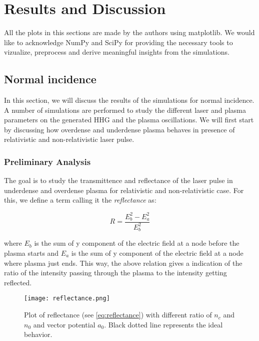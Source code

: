 \section{Results and Discussion}

All the plots in this sections are made by the authors using matplotlib\cite{matplotlib}. We would like to acknowledge NumPy\cite{numpy} and SciPy\cite{scipy} for providing the necessary tools to vizualize, preprocess and derive meaningful insights from the simulations.

\subsection{Normal incidence}
In this section, we will discuss the results of the simulations for normal incidence. A number of simulations are performed to study the different laser and plasma parameters on the generated HHG and the plasma oscillations. We will first start by discussing how overdense and underdense plasma behaves in presence of relativistic and non-relativistic laser pulse.

\subsubsection{Preliminary Analysis}

The goal is to study the transmittence and reflectance of the laser pulse in underdense and overdense plasma for relativistic and non-relativistic case. For this, we define a term calling it the \textit{reflectance} as:

\begin{equation}
    \label{eq:reflectance}
    R = \frac{{E_{b}^2}-{E_{a}^2}}{{E_{b}^2}}
\end{equation}

where $E_{b}$ is the sum of y component of the electric field at a node before the plasma starts and $E_{a}$ is the sum of y component of the electric field at a node where plasma just ends. This way, the above relation gives a indication of the ratio of the intensity passing through the plasma to the intensity getting reflected.

\begin{figure}[H]
    \centering
    \texttt{[image: reflectance.png]}
    \caption{Plot of reflectance (see \ref{eq:reflectance}) with different ratio of $n_c$ and $n_0$ and vector potential $a_0$. Black dotted line represents the ideal behavior.}
    \label{fig:reflectance}
\end{figure}

